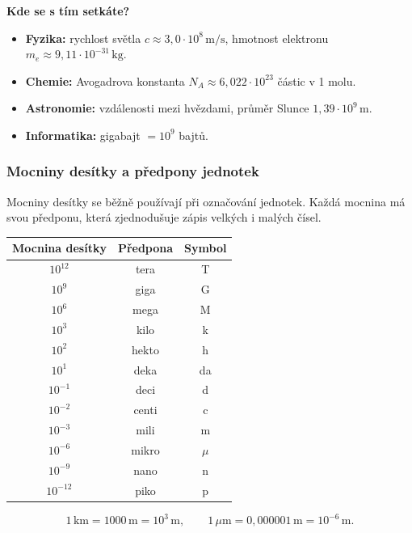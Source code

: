 \documentclass[12pt,a4paper]{article}
\begin{document}
\textbf{Kde se s tím setkáte?}
\begin{itemize}
    \item \textbf{Fyzika:} rychlost světla $c \approx 3{,}0 \cdot 10^8 \,\text{m/s}$, hmotnost elektronu $m_e \approx 9{,}11 \cdot 10^{-31} \,\text{kg}$.
    \item \textbf{Chemie:} Avogadrova konstanta $N_A \approx 6{,}022 \cdot 10^{23}$ částic v 1 molu.
    \item \textbf{Astronomie:} vzdálenosti mezi hvězdami, průměr Slunce $1{,}39 \cdot 10^9 \,\text{m}$.
    \item \textbf{Informatika:} gigabajt $= 10^9$ bajtů.
\end{itemize}

\subsubsection*{Mocniny desítky a předpony jednotek}

Mocniny desítky se běžně používají při označování jednotek.  
Každá mocnina má svou předponu, která zjednodušuje zápis velkých i malých čísel.

\begin{center}
\renewcommand{\arraystretch}{1.3}
\begin{tabular}{|c|c|c|}
\hline
\textbf{Mocnina desítky} & \textbf{Předpona} & \textbf{Symbol} \\ \hline
$10^{12}$ & tera & T \\ \hline
$10^{9}$  & giga & G \\ \hline
$10^{6}$  & mega & M \\ \hline
$10^{3}$  & kilo & k \\ \hline
$10^{2}$  & hekto & h \\ \hline
$10^{1}$  & deka & da \\ \hline
$10^{-1}$ & deci & d \\ \hline
$10^{-2}$ & centi & c \\ \hline
$10^{-3}$ & mili & m \\ \hline
$10^{-6}$ & mikro & $\mu$ \\ \hline
$10^{-9}$ & nano & n \\ \hline
$10^{-12}$ & piko & p \\ \hline
\end{tabular}
\end{center}

\begin{examplebox}
\[
1\,\text{km} = 1000\,\text{m} = 10^3 \,\text{m}, \qquad
1\,\mu\text{m} = 0{,}000001\,\text{m} = 10^{-6}\,\text{m}.
\]
\end{examplebox}
\end{document}
